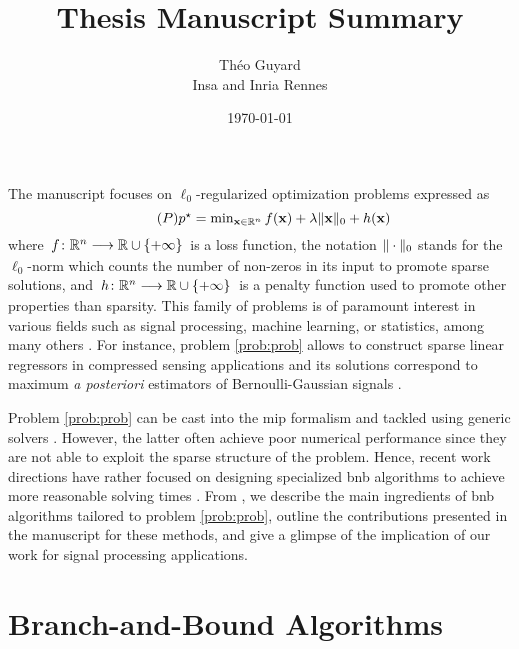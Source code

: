 \documentclass[11pt]{article}
\title{Thesis Manuscript Summary}
\author{Théo Guyard \\ \small{Insa and Inria Rennes}}
\date{\today}
\begin{document}
 

\maketitle
\vspace*{-30pt}

The manuscript focuses on $\ell_0$-regularized optimization problems expressed as
\begin{equation}
    \label{prob:prob}
    \tag{$\ppb$}
    \textstyle
    \opt{\pobj} = \min_{\pv \in \kR^{\pdim}} \lfunc(\pv) + \reg\norm{\pv}{0} + \pfunc(\pv)
\end{equation}
where $\kfuncdef{\lfunc}{\kR^{\pdim}}{\kR \cup \{+\infty\}}$ is a loss function, the notation $\|\cdot\|_0$ stands for the $\ell_0$-norm which counts the number of non-zeros in its input to promote sparse solutions, and $\kfuncdef{\pfunc}{\kR^{\pdim}}{\kR \cup \{+\infty\}}$ is a penalty function used to promote other properties than sparsity.
This family of problems is of paramount interest in various fields such as signal processing, machine learning, or statistics, among many others \citep{tillmann2021cardinality}.
For instance, problem \eqref{prob:prob} allows to construct sparse linear regressors in compressed sensing applications \citep{tropp2010computational} and its solutions correspond to maximum \textit{a posteriori} estimators of  Bernoulli-Gaussian signals \citep{soussen2011bernoulli}.

Problem \eqref{prob:prob} can be cast into the \gls{mip} formalism and tackled using generic solvers \citep{bourguignon2015exact}.
However, the latter often achieve poor numerical performance since they are not able to exploit the sparse structure of the problem.
Hence, recent work directions have rather focused on designing specialized \gls{bnb} algorithms to achieve more reasonable solving times \citep{ben2022global,hazimeh2022sparse}.
From , we describe the main ingredients of \gls{bnb} algorithms tailored to problem \eqref{prob:prob}, outline the contributions presented in the manuscript for these methods, and give a glimpse of the implication of our work for signal processing applications.



\section{Branch-and-Bound Algorithms}
\label{sec:bnb}
\end{document}
